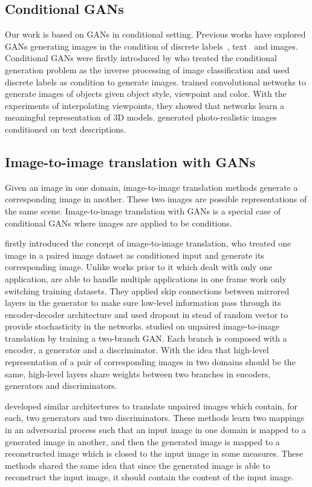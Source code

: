 \subsection{Conditional GANs}
Our work is based on GANs in conditional setting. Previous works have explored GANs generating images in the condition of discrete labels~\cite{CGAN}, text~\cite{reed1, reed2} and images. 
Conditional GANs were firstly introduced by \cite{CGAN} who treated the conditional generation problem as the inverse processing of image classification and used discrete labels as condition to generate images.
%
\cite{Dosovitskiy} trained convolutional networks to generate images of objects given object style, viewpoint and color. With the experiments of interpolating viewpoints, they showed that networks learn a meaningful representation of 3D models. 
%
\cite{reed1, reed2} generated photo-realistic images conditioned on text descriptions.

\subsection{Image-to-image translation with GANs}
Given an image in one domain, image-to-image translation methods generate a corresponding image in another. These two images are possible representations of the same scene. Image-to-image translation with GANs is a special case of conditional GANs where images are applied to be conditions. 
%

\cite{pix2pix} firstly introduced the concept of image-to-image translation, who treated one image in a paired image dataset as conditioned input and generate its corresponding image. Unlike works prior to it which dealt with only one application, \cite{pix2pix} are able to handle multiple applications in one frame work only switching training datasets. They applied skip connections between mirrored layers in the generator to make sure low-level information pass through its encoder-decoder architecture and used dropout in stead of random vector to provide stochasticity in the networks.
%
\cite{unit} studied on unpaired image-to-image translation by training a two-branch GAN. Each branch is composed with a encoder, a generator and a discriminator. With the idea that high-level representation of a pair of corresponding images in two domains should be the same, high-level layers share weights between two branches in encoders, generators and discriminators. 
%

\cite{cyclegan, dualgan, discogan} developed similar architectures to translate unpaired images which contain, for each, two generators and two discriminators. These methods learn two mappings in an adversarial process such that an input image in one domain is mapped to a generated image in another, and then the generated image is mapped to a reconstructed image which is closed to the input image in some measures. These methods shared the same idea that since the generated image is able to reconstruct the input image, it should contain the content of the input image.
